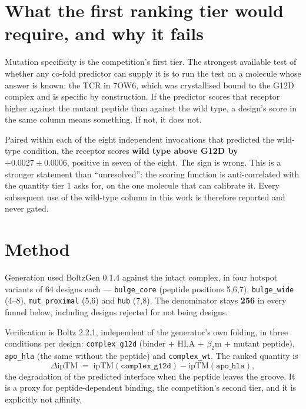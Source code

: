 \documentclass[11pt,a4paper]{article}
\newcommand{\drop}{\ensuremath{\Delta\text{ipTM}}}
\begin{document}
\section{What the first ranking tier would require, and why it fails}

Mutation specificity is the competition's first tier. The strongest available test of whether any
co-fold predictor can supply it is to run the test on a molecule whose answer is known: the TCR
in 7OW6, which was crystallised bound to the G12D complex and is specific by construction. If the
predictor scores that receptor higher against the mutant peptide than against the wild type, a
design's score in the same column means something. If not, it does not.

Paired within each of the eight independent invocations that predicted the wild-type condition,
the receptor scores \textbf{wild type above G12D by $+0.0027 \pm 0.0006$}, positive in seven of
the eight. The sign is wrong. This is a stronger statement than ``unresolved'': the scoring
function is anti-correlated with the quantity tier 1 asks for, on the one molecule that can
calibrate it. Every subsequent use of the wild-type column in this work is therefore reported
and never gated.

\section{Method}

Generation used BoltzGen 0.1.4 against the intact complex, in four hotspot variants of 64 designs
each --- \texttt{bulge\_core} (peptide positions 5,6,7), \texttt{bulge\_wide} (4--8),
\texttt{mut\_proximal} (5,6) and \texttt{hub} (7,8). The denominator stays \textbf{256} in every
funnel below, including designs rejected for not being designs.

Verification is Boltz 2.2.1, independent of the generator's own folding, in three conditions per
design: \texttt{complex\_g12d} (binder + HLA + $\beta_2$m + mutant peptide), \texttt{apo\_hla}
(the same without the peptide) and \texttt{complex\_wt}. The ranked quantity is
\begin{equation}
\drop \;=\; \text{ipTM}(\texttt{complex\_g12d}) - \text{ipTM}(\texttt{apo\_hla}),
\end{equation}
the degradation of the predicted interface when the peptide leaves the groove. It is a proxy for
peptide-dependent binding, the competition's second tier, and it is explicitly not affinity.
\end{document}
